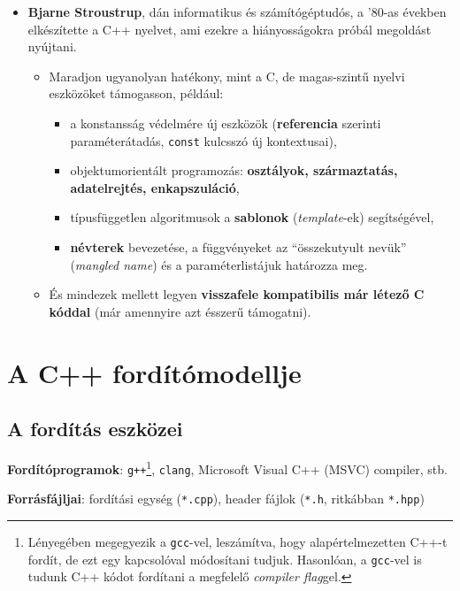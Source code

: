 \documentclass[a4paper, 11pt, oneside]{book}
\begin{document}
\begin{itemize}
\begin{itemize}
	\end{itemize}

	\item \textbf{Bjarne Stroustrup}, dán informatikus és számítógéptudós, a '80-as években elkészítette a C++ nyelvet, ami ezekre a hiányosságokra próbál megoldást nyújtani.
	
	\begin{itemize}
		\item Maradjon ugyanolyan hatékony, mint a C, de magas-szintű nyelvi eszközöket támogasson, például:
		
		\begin{itemize}
			\item a konstansság védelmére új eszközök (\textbf{referencia} szerinti paraméterátadás, \verb|const| kulcsszó új kontextusai),
			\item objektumorientált programozás: \textbf{osztályok, származtatás, adatelrejtés, enkapszuláció},
			\item típusfüggetlen algoritmusok a \textbf{sablonok} (\textit{template}-ek) segítségével,
			\item \textbf{névterek} bevezetése, a függvényeket az ``összekutyult nevük'' (\textit{mangled name}) és a paraméterlistájuk határozza meg.
		\end{itemize}
		
		\item És mindezek mellett legyen \textbf{visszafele kompatibilis már létező C kóddal} (már amennyire azt ésszerű támogatni).
	\end{itemize}
\end{itemize}

\section{A C++ fordítómodellje}

\subsection{A fordítás eszközei}

\textbf{Fordítóprogramok}: \verb|g++|\footnote{Lényegében megegyezik a \verb|gcc|-vel, leszámítva, hogy alapértelmezetten C++-t fordít, de ezt egy kapcsolóval módosítani tudjuk. Hasonlóan, a \verb|gcc|-vel is tudunk C++ kódot fordítani a megfelelő \textit{compiler flag}gel.}, \verb|clang|, Microsoft Visual C++ (MSVC) compiler, stb.

\textbf{Forrásfájljai}: fordítási egység (\verb|*.cpp|), header fájlok (\verb|*.h|, ritkábban \verb|*.hpp|)
\end{document}
